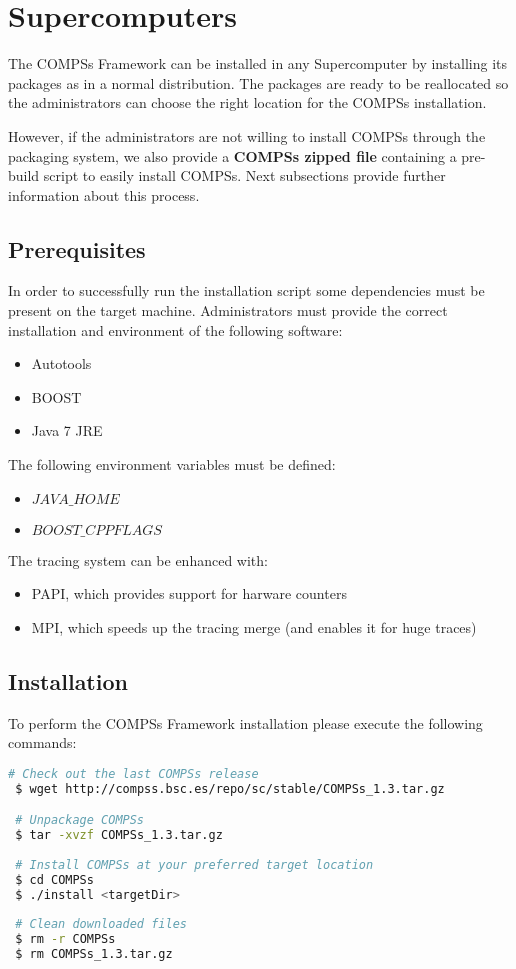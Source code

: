 \section{Supercomputers}
\label{sec:Supercomputers}

The COMPSs Framework can be installed in any Supercomputer by installing its packages as in a normal distribution. The packages are
ready to be reallocated so the administrators can choose the right location for the COMPSs installation. \newline

However, if the administrators are not willing to install COMPSs through the packaging system, we also provide a \textbf{COMPSs 
zipped file} containing a pre-build script to easily install COMPSs. Next subsections provide further information about this process.

\subsection{Prerequisites}
In order to successfully run the installation script some dependencies must be present on the target machine. Administrators must 
provide the correct installation and environment of the following software:
\begin{itemize}
 \item Autotools
 \item BOOST
 \item Java 7 JRE
\end{itemize}

The following environment variables must be defined:
\begin{itemize}
 \item $JAVA\_HOME$
 \item $BOOST\_CPPFLAGS$
\end{itemize}

The tracing system can be enhanced with:
\begin{itemize}
 \item PAPI, which provides support for harware counters
 \item MPI, which speeds up the tracing merge (and enables it for huge traces)
\end{itemize}


\subsection{Installation}
To perform the COMPSs Framework installation please execute the following commands:
\begin{lstlisting}[language=bash]
 # Check out the last COMPSs release
 $ wget http://compss.bsc.es/repo/sc/stable/COMPSs_1.3.tar.gz

 # Unpackage COMPSs
 $ tar -xvzf COMPSs_1.3.tar.gz
 
 # Install COMPSs at your preferred target location
 $ cd COMPSs
 $ ./install <targetDir>
 
 # Clean downloaded files
 $ rm -r COMPSs
 $ rm COMPSs_1.3.tar.gz
\end{lstlisting}

